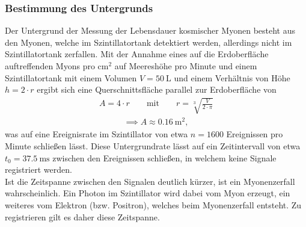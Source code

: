 \subsubsection{Bestimmung des Untergrunds}
\noindent Der Untergrund der Messung der Lebensdauer kosmischer Myonen besteht
aus den Myonen, welche im Szintillatortank detektiert werden, allerdings nicht
im Szintillatortank zerfallen. Mit der Annahme eines auf die Erdoberfläche
auftreffenden Myons pro $\si{\centi\meter^2}$ auf Meereshöhe pro Minute
\cite{grupen} und einem Szintillatortank mit einem Volumen $V = \SI{50}{\liter}$
und einem Verhältnis von Höhe  $h = 2 \cdot r$ \cite{anleitung} ergibt sich eine
Querschnittsfläche parallel zur Erdoberfläche von \\
\begin{align}
  A = 4 \cdot r \qquad \text{mit} \qquad r = \sqrt[3]{\frac{V}{2 \cdot \pi}}
  \label{eqn:03}
\end{align}
\begin{align*}
  \implies A \approx \SI{0.16}{\meter^2},
\end{align*}
\noindent was auf eine Ereignisrate im Szintillator von etwa $n = \num{1600}$
Ereignissen pro Minute schließen lässt. Diese Untergrundrate lässt auf ein
Zeitintervall von etwa $t_0 = \SI{37.5}{\milli\second}$ zwischen den Ereignissen
schließen, in welchem keine Signale registriert werden. \\
\newline
\noindent Ist die Zeitspanne zwischen den Signalen deutlich kürzer, ist ein
Myonenzerfall wahrscheinlich. Ein Photon im Szintillator wird dabei vom Myon
erzeugt, ein weiteres vom Elektron (bzw. Positron), welches beim Myonenzerfall
entsteht. Zu registrieren gilt es daher diese Zeitspanne. \\
